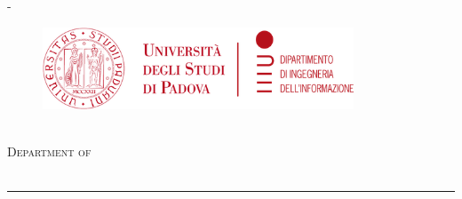 \begin{titlingpage}
	\thispagestyle{empty}

	{
		\setlength\parindent{0pt}


		\calccentering\unitlength %

		\begin{adjustwidth}{\unitlength}{-\unitlength}
			\begin{center}

				\begin{figure}
					\centering
					\includegraphics[height=2.45cm]{themes/unipd-dei/static/unipd-dei.png}%
				\end{figure}

				{\scshape \Large{\bfseries{\UnivName}}} \\
				{\scshape \large{Department of \DeptName}} \\
				\vspace{3pt}
				{\scshape \large{\textit{\DegreeName}}} \\
				\par\noindent\rule{\textwidth}{0.4pt}


\end{center}
\end{adjustwidth}}
\end{titlingpage}
